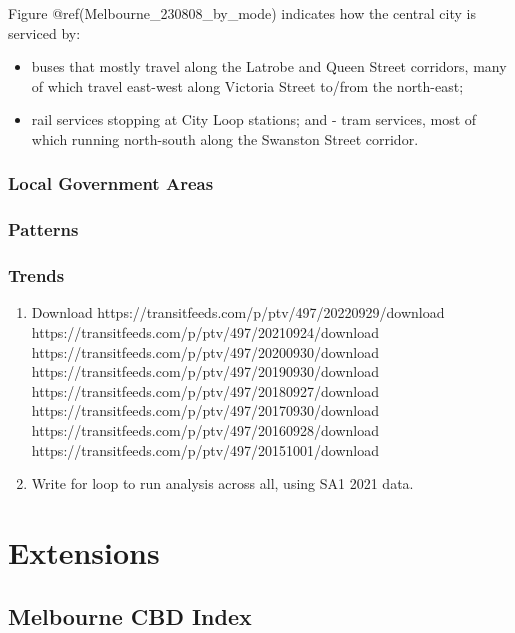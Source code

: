 \documentclass[preprint, 3p,
authoryear]{elsarticle} %
\providecommand{\tightlist}{%
  \setlength{\itemsep}{0pt}\setlength{\parskip}{0pt}}
\begin{document}
Figure @ref(Melbourne\_230808\_by\_mode) indicates how the central city
is serviced by:

\begin{itemize}
\tightlist
\item
  buses that mostly travel along the Latrobe and Queen Street corridors,
  many of which travel east-west along Victoria Street to/from the
  north-east;
\item
  rail services stopping at City Loop stations; and - tram services,
  most of which running north-south along the Swanston Street corridor.
\end{itemize}

\hypertarget{local-government-areas}{%
\subsubsection{Local Government Areas}\label{local-government-areas}}

\hypertarget{patterns}{%
\subsubsection{Patterns}\label{patterns}}

\hypertarget{trends}{%
\subsubsection{Trends}\label{trends}}

\begin{enumerate}
\def\labelenumi{\arabic{enumi}.}
\item
  Download https://transitfeeds.com/p/ptv/497/20220929/download
  https://transitfeeds.com/p/ptv/497/20210924/download
  https://transitfeeds.com/p/ptv/497/20200930/download
  https://transitfeeds.com/p/ptv/497/20190930/download
  https://transitfeeds.com/p/ptv/497/20180927/download
  https://transitfeeds.com/p/ptv/497/20170930/download
  https://transitfeeds.com/p/ptv/497/20160928/download
  https://transitfeeds.com/p/ptv/497/20151001/download
\item
  Write for loop to run analysis across all, using SA1 2021 data.
\end{enumerate}

\hypertarget{extensions}{%
\section{Extensions}\label{extensions}}

\hypertarget{melbourne-cbd-index}{%
\subsection{Melbourne CBD Index}\label{melbourne-cbd-index}}
\end{document}
